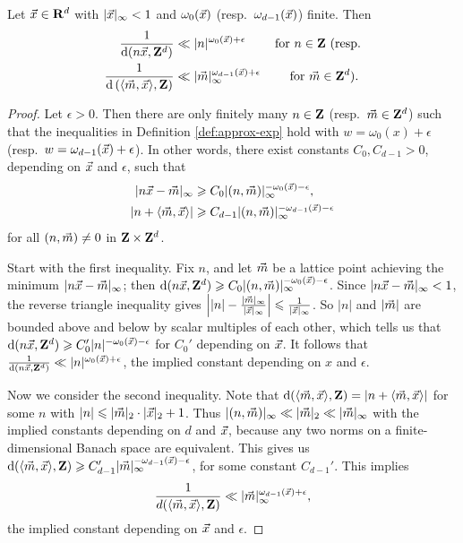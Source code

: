 \begin{lemma}\label{lem:bound-distance}
Let $\vec{x}\in \mathbf{R}^d$ with $|\vec{x}|_\infty< 1$ and $\omega_0(\vec{x})$ 
(resp.~$\omega_{d-1}(\vec{x})$) finite. Then 
\begin{align*}
	\frac{1}{\mathrm{d}(n \vec{x},\mathbf{Z}^d)} 
		&\ll |n|^{\omega_0(\vec{x})+\epsilon}\qquad \text{ for $n\in \mathbf{Z}$ (resp.} \\
	\frac{1}{\mathrm{d}\left(\langle \vec{m},\vec{x}\rangle, \mathbf{Z}\right)} 
		&\ll |\vec{m}|_\infty^{\omega_{d-1}(\vec{x})+\epsilon} \qquad\text{ for $\vec{m}\in \mathbf{Z}^d$).}
\end{align*}
\end{lemma}
\begin{proof}
Let $\epsilon>0$. Then there are only finitely many $n\in \mathbf{Z}$ 
(resp.~$\vec{m}\in \mathbf{Z}^d$) such that the inequalities in Definition 
\ref{def:approx-exp} hold with $w = \omega_0(x)+\epsilon$ 
(resp.~$w = \omega_{d-1}(\vec{x})+\epsilon$). In other words, there exist constants 
$C_0, C_{d-1}>0$, depending on $\vec{x}$ and $\epsilon$, such that 
\begin{align*}
	|n \vec{x} - \vec{m}|_\infty 
		&\geqslant C_0 |(n,\vec{m})|_\infty^{-\omega_0(\vec{x})-\epsilon} ,\\
	|n + \langle \vec{m},\vec{x}\rangle| 
		&\geqslant C_{d-1} |(n,\vec{m})|_\infty^{-\omega_{d-1}(\vec{x})-\epsilon} 
\end{align*}
for all $(n,\vec{m})\ne 0$ in $\mathbf{Z}\times\mathbf{Z}^d$. 

Start with the first inequality. Fix $n$, and let $\vec{m}$ be a lattice point 
achieving the minimum $|n \vec{x} - \vec{m}|_\infty$; then 
$\mathrm{d}(n \vec{x},\mathbf{Z}^d) \geqslant C_0 |(n,\vec{m})|_\infty^{-\omega_0(\vec{x})-\epsilon}$. 
Since $|n\vec{x} - \vec{m}|_\infty < 1$, the reverse triangle inequality gives 
$\left| |n| - \frac{|\vec{m}|_\infty}{|\vec{x}|_\infty}\right| \leqslant \frac{1}{|\vec{x}|_\infty}$. So $|n|$ and $|\vec{m}|$ are bounded above and below by scalar multiples 
of each other, which tells us that 
$\mathrm{d}(n \vec{x},\mathbf{Z}^d) \geqslant C_0' |n|^{-\omega_0(\vec{x})-\epsilon}$ for $C_0'$ 
depending on $\vec{x}$. It follows that 
$\frac{1}{\mathrm{d}(n \vec{x},\mathbf{Z}^d)} \ll |n|^{\omega_0(\vec{x})+\epsilon}$, the 
implied constant depending on $x$ and $\epsilon$.

Now we consider the second inequality. Note 
that $\mathrm{d}(\langle \vec{m},\vec{x}\rangle,\mathbf{Z}) = |n + \langle \vec{m},\vec{x}\rangle|$ for 
some $n$ with $|n| \leqslant |\vec{m}|_2\cdot |\vec{x}|_2 + 1$. Thus 
$|(n,\vec{m})|_\infty \ll |\vec{m}|_2 \ll |\vec{m}|_\infty$ with the implied constants 
depending on $d$ and $\vec{x}$, because any two norms on a 
finite-dimensional Banach space are equivalent. This gives us 
$\mathrm{d}(\langle\vec{m},\vec{x}\rangle,\mathbf{Z}) \geqslant C_{d-1}' |\vec{m}|_\infty^{-\omega_{d-1}(\vec{x})-\epsilon}$, 
for some constant $C_{d-1}'$. This implies 
\[
	\frac{1}{d(\langle \vec{m},\vec{x}\rangle,\mathbf{Z})} \ll |\vec{m}|_\infty^{\omega_{d-1}(\vec{x})+\epsilon} ,
\]
the implied constant depending on $\vec{x}$ and $\epsilon$.
\end{proof}





